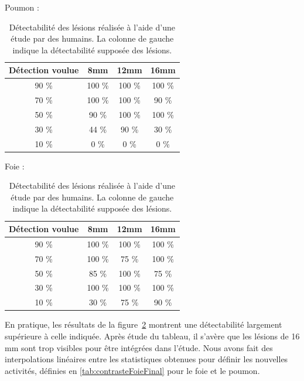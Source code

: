 \begin{table}
\centering

Poumon :\\
\begin{tabular}{|c|c|c|c|}
 \hline
 Détection voulue & 	8mm & 	12mm & 	16mm \\
\hline
90 \%		  & 100 \%  & 100 \% & 100 \% \\
\hline
70 \%		  & 100 \%  & 100 \% & 90 \%\\
\hline
50 \%		  & 90 \%  & 100 \% & 100 \%\\
\hline
30 \%		  & 44 \%  & 90 \% & 30 \%\\
\hline
10 \% 		  & 0 \%  & 0 \% & 0 \%\\
\hline
\end{tabular}

\vspace{0.5cm}


Foie :\\
\begin{tabular}{|c|c|c|c|}
 \hline
 Détection voulue & 	8mm & 	12mm & 	16mm \\
\hline
90 \%		  & 100 \%  & 100 \% & 100 \% \\
\hline
70 \%		  & 100 \%  & 75 \% & 100 \%\\
\hline
50 \%		  & 85 \%  & 100 \% & 75 \%\\
\hline
30 \%		  & 100 \%  & 100 \% & 100 \%\\
\hline
10 \% 		  & 30 \%  & 75 \% & 90 \%\\
\hline

\end{tabular}

\caption[Détectabilité estimée des lésions en fonction du contraste et de leur diamètre]{Détectabilité des lésions réalisée à l'aide d'une étude par des humains. La colonne de gauche indique la détectabilité supposée des lésions.}
\label{fig:detectabiliteVue}
\end{table}

En pratique, les résultats de la figure~\ref{fig:detectabiliteVue} montrent une détectabilité largement supérieure à celle indiquée. Après étude du tableau, il s'avère que les lésions de 16 mm sont trop visibles pour être intégrées dans l'étude. Nous avons fait des interpolations linéaires entre les statistiques obtenues pour définir les nouvelles activités, définies en \ref{tab:contrasteFoieFinal} pour le foie et le poumon.




